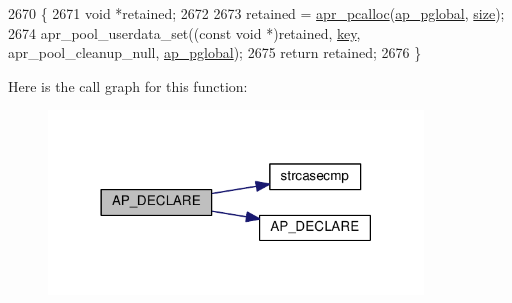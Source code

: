 \begin{DoxyCode}
2670 \{
2671     \textcolor{keywordtype}{void} *retained;
2672 
2673     retained = \hyperlink{group__apr__pools_gad214fc0160de3c22b6435e29ea20fce8}{apr\_pcalloc}(\hyperlink{group__APACHE__CORE__MAIN_gae8d16ca8eacac353b47d8d908c630d94}{ap\_pglobal}, \hyperlink{group__APACHE__CORE__CONFIG_ga2bd3edb50f631a96f1b729fde236ff43}{size});
2674     apr\_pool\_userdata\_set((\textcolor{keyword}{const} \textcolor{keywordtype}{void} *)retained, \hyperlink{group__MOD__CACHE_ga11d8023381192746eb96be162398fe1c}{key}, apr\_pool\_cleanup\_null, 
      \hyperlink{group__APACHE__CORE__MAIN_gae8d16ca8eacac353b47d8d908c630d94}{ap\_pglobal});
2675     \textcolor{keywordflow}{return} retained;
2676 \}
\end{DoxyCode}


Here is the call graph for this function\+:
\nopagebreak
\begin{figure}[H]
\begin{center}
\leavevmode
\includegraphics[width=282pt]{group__APACHE__CORE__CONFIG_ga8ecf6fcf41181528bbfea791523ce968_cgraph}
\end{center}
\end{figure}


